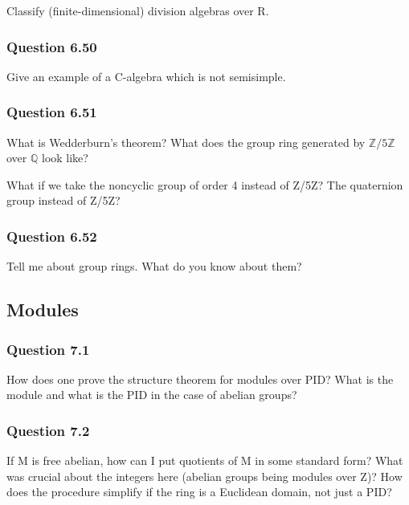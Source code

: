 Classify (finite-dimensional) division algebras over R.

\hypertarget{question-6.50}{%
\subsubsection{Question 6.50}\label{question-6.50}}

Give an example of a C-algebra which is not semisimple.

\hypertarget{question-6.51}{%
\subsubsection{Question 6.51}\label{question-6.51}}

What is Wedderburn's theorem? What does the group ring generated by
\({\mathbb{Z}}/5{\mathbb{Z}}\) over \({\mathbb{Q}}\) look like?

What if we take the noncyclic group of order 4 instead of Z/5Z? The
quaternion group instead of Z/5Z?

\hypertarget{question-6.52}{%
\subsubsection{Question 6.52}\label{question-6.52}}

Tell me about group rings. What do you know about them?

\hypertarget{modules-2}{%
\subsection{Modules}\label{modules-2}}

\hypertarget{question-7.1}{%
\subsubsection{Question 7.1}\label{question-7.1}}

How does one prove the structure theorem for modules over PID? What is
the module and what is the PID in the case of abelian groups?

\hypertarget{question-7.2}{%
\subsubsection{Question 7.2}\label{question-7.2}}

If M is free abelian, how can I put quotients of M in some standard
form? What was crucial about the integers here (abelian groups being
modules over Z)? How does the procedure simplify if the ring is a
Euclidean domain, not just a PID?

